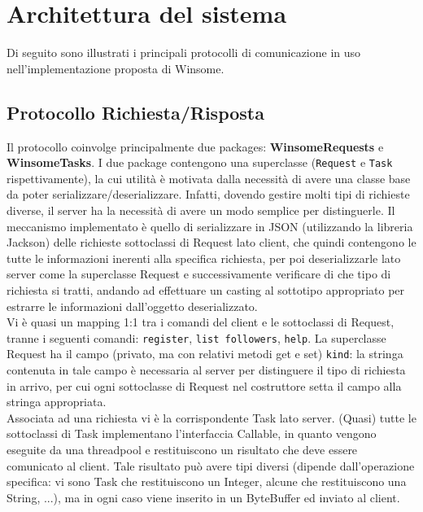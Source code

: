 \section{Architettura del sistema}
Di seguito sono illustrati i principali protocolli di comunicazione in uso nell'implementazione proposta di Winsome.
 
 \subsection{Protocollo Richiesta/Risposta}
 Il protocollo coinvolge principalmente due packages: \textbf{WinsomeRequests} e \textbf{WinsomeTasks}.
 I due package contengono una superclasse (\verb|Request| e \verb|Task| rispettivamente), la cui utilità è 
 motivata dalla necessità di avere una classe base da poter serializzare/deserializzare.
 Infatti, dovendo gestire molti tipi di richieste diverse, il server
 ha la necessità di avere un modo semplice per distinguerle. Il meccanismo implementato è quello di serializzare in
 JSON (utilizzando la libreria Jackson) delle richieste sottoclassi di Request lato client, che quindi contengono
 le tutte le informazioni inerenti alla specifica richiesta, per poi deserializzarle lato server come la superclasse
 Request e successivamente verificare di che tipo di richiesta si tratti, andando ad effettuare un casting al sottotipo
 appropriato per estrarre le informazioni dall'oggetto deserializzato.\\
 
 Vi è quasi un mapping 1:1 tra i comandi del client e le sottoclassi di Request, tranne i seguenti comandi: \verb|register|, \verb|list followers|, \verb|help|.
  La superclasse Request ha il campo (privato, ma con relativi metodi get e set) \verb|kind|: 
 la stringa contenuta in tale campo è necessaria al server per distinguere il tipo di richiesta in arrivo, per cui
 ogni sottoclasse di Request nel costruttore setta il campo alla stringa appropriata.\\
 Associata ad una richiesta vi è la corrispondente Task lato server. (Quasi) tutte le sottoclassi di Task implementano l'interfaccia
 Callable, in quanto vengono eseguite da una threadpool e restituiscono un risultato che deve essere comunicato al client.
 Tale risultato può avere tipi diversi (dipende dall'operazione specifica: vi sono Task che restituiscono un Integer, 
 alcune che restituiscono una String, ...), ma in ogni caso viene inserito in un ByteBuffer ed inviato al client.\\
 
